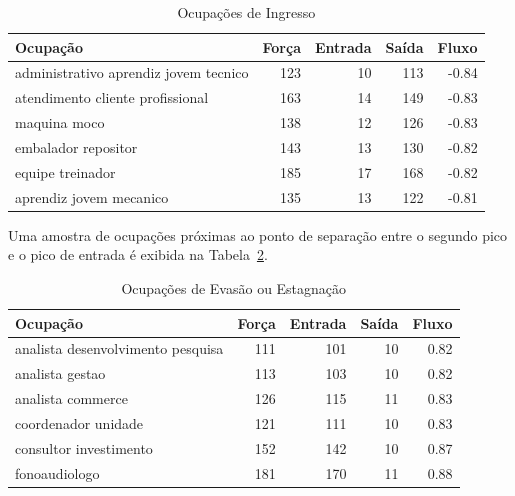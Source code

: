 \documentclass[12pt,a4paper]{article}
\begin{document}
\begin{table}[!h]
    \centering
    \begin{tabular}{l|r|r|r|r}
        \hline
        Ocupação & Força & Entrada & Saída & Fluxo\\
        \hline
        administrativo aprendiz jovem tecnico & 123 & 10 & 113 & -0.84\\
        \hline
        atendimento cliente profissional & 163 & 14 & 149 & -0.83\\
        \hline
        maquina moco & 138 & 12 & 126 & -0.83\\
        \hline
        embalador repositor & 143 & 13 & 130 & -0.82\\
        \hline
        equipe treinador & 185 & 17 & 168 & -0.82\\
        \hline
        aprendiz jovem mecanico & 135 & 13 & 122 & -0.81\\
        \hline
    \end{tabular}
    \caption{Ocupações de Ingresso}
    \label{tab:ocupacoes-de-ingresso}
\end{table}

Uma amostra de ocupações próximas ao ponto de separação entre o segundo pico e o pico de entrada é exibida na Tabela~\ref{tab:ocupacoes-de-evasao}.

\begin{table}[!h]
    \centering
    \begin{tabular}{l|r|r|r|r}
        \hline
        Ocupação & Força & Entrada & Saída & Fluxo\\
        \hline
        analista desenvolvimento pesquisa & 111 & 101 & 10 & 0.82\\
        \hline
        analista gestao & 113 & 103 & 10 & 0.82\\
        \hline
        analista commerce & 126 & 115 & 11 & 0.83\\
        \hline
        coordenador unidade & 121 & 111 & 10 & 0.83\\
        \hline
        consultor investimento & 152 & 142 & 10 & 0.87\\
        \hline
        fonoaudiologo & 181 & 170 & 11 & 0.88\\
        \hline
    \end{tabular}
    \caption{Ocupações de Evasão ou Estagnação}
    \label{tab:ocupacoes-de-evasao}
\end{table}

\end{document}

